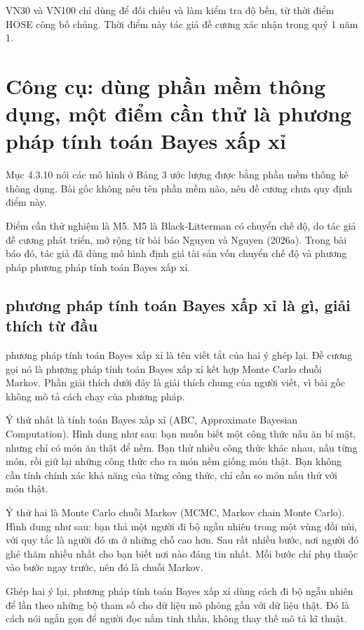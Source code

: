 VN30 và VN100 chỉ dùng để đối chiếu và làm kiểm tra độ bền, từ thời điểm HOSE công bố chúng. Thời điểm này tác giả đề cương xác nhận trong quý 1 năm 1.

\section{Công cụ: dùng phần mềm thông dụng, một điểm cần thử là phương pháp tính toán Bayes xấp xỉ}

Mục 4.3.10 nói các mô hình ở Bảng 3 ước lượng được bằng phần mềm thống kê thông dụng. Bài gốc không nêu tên phần mềm nào, nên đề cương chưa quy định điểm này.

Điểm cần thử nghiệm là M5. M5 là Black-Litterman có chuyển chế độ, do tác giả đề cương phát triển, mở rộng từ bài báo Nguyen và Nguyen (2026a). Trong bài báo đó, tác giả đã dùng mô hình định giá tài sản vốn chuyển chế độ và phương pháp phương pháp tính toán Bayes xấp xỉ.

\subsection{phương pháp tính toán Bayes xấp xỉ là gì, giải thích từ đầu}

phương pháp tính toán Bayes xấp xỉ là tên viết tắt của hai ý ghép lại. Đề cương gọi nó là phương pháp tính toán Bayes xấp xỉ kết hợp Monte Carlo chuỗi Markov. Phần giải thích dưới đây là giải thích chung của người viết, vì bài gốc không mô tả cách chạy của phương pháp.

Ý thứ nhất là tính toán Bayes xấp xỉ (ABC, Approximate Bayesian Computation). Hình dung như sau: bạn muốn biết một công thức nấu ăn bí mật, nhưng chỉ có món ăn thật để nếm. Bạn thử nhiều công thức khác nhau, nấu từng món, rồi giữ lại những công thức cho ra món nếm giống món thật. Bạn không cần tính chính xác khả năng của từng công thức, chỉ cần so món nấu thử với món thật.

Ý thứ hai là Monte Carlo chuỗi Markov (MCMC, Markov chain Monte Carlo). Hình dung như sau: bạn thả một người đi bộ ngẫu nhiên trong một vùng đồi núi, với quy tắc là người đó ưa ở những chỗ cao hơn. Sau rất nhiều bước, nơi người đó ghé thăm nhiều nhất cho bạn biết nơi nào đáng tin nhất. Mỗi bước chỉ phụ thuộc vào bước ngay trước, nên đó là chuỗi Markov.

Ghép hai ý lại, phương pháp tính toán Bayes xấp xỉ dùng cách đi bộ ngẫu nhiên để lần theo những bộ tham số cho dữ liệu mô phỏng gần với dữ liệu thật. Đó là cách nói ngắn gọn để người đọc nắm tinh thần, không thay thế mô tả kĩ thuật.

